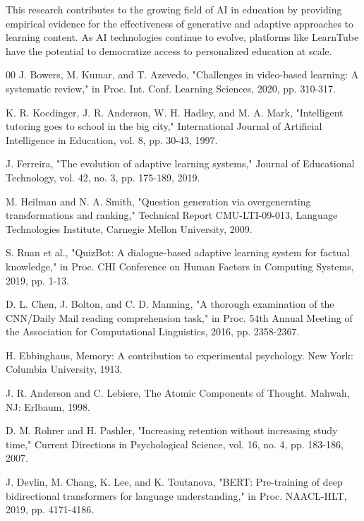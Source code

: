 \documentclass[conference]{IEEEtran}
\begin{document}
This research contributes to the growing field of AI in education by providing empirical evidence for the effectiveness of generative and adaptive approaches to learning content. As AI technologies continue to evolve, platforms like LearnTube have the potential to democratize access to personalized education at scale.

\begin{thebibliography}{00}
 J. Bowers, M. Kumar, and T. Azevedo, "Challenges in video-based learning: A systematic review," in Proc. Int. Conf. Learning Sciences, 2020, pp. 310-317.

 K. R. Koedinger, J. R. Anderson, W. H. Hadley, and M. A. Mark, "Intelligent tutoring goes to school in the big city," International Journal of Artificial Intelligence in Education, vol. 8, pp. 30-43, 1997.

 J. Ferreira, "The evolution of adaptive learning systems," Journal of Educational Technology, vol. 42, no. 3, pp. 175-189, 2019.

 M. Heilman and N. A. Smith, "Question generation via overgenerating transformations and ranking," Technical Report CMU-LTI-09-013, Language Technologies Institute, Carnegie Mellon University, 2009.

 S. Ruan et al., "QuizBot: A dialogue-based adaptive learning system for factual knowledge," in Proc. CHI Conference on Human Factors in Computing Systems, 2019, pp. 1-13.

 D. L. Chen, J. Bolton, and C. D. Manning, "A thorough examination of the CNN/Daily Mail reading comprehension task," in Proc. 54th Annual Meeting of the Association for Computational Linguistics, 2016, pp. 2358-2367.

 H. Ebbinghaus, Memory: A contribution to experimental psychology. New York: Columbia University, 1913.

 J. R. Anderson and C. Lebiere, The Atomic Components of Thought. Mahwah, NJ: Erlbaum, 1998.

 D. M. Rohrer and H. Pashler, "Increasing retention without increasing study time," Current Directions in Psychological Science, vol. 16, no. 4, pp. 183-186, 2007.

 J. Devlin, M. Chang, K. Lee, and K. Toutanova, "BERT: Pre-training of deep bidirectional transformers for language understanding," in Proc. NAACL-HLT, 2019, pp. 4171-4186.
\end{thebibliography}
\end{document}
